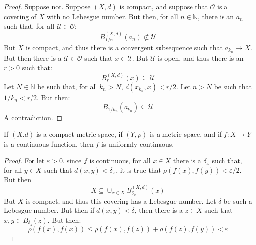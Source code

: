 \documentclass[crop=false,class=article,oneside]{standalone}
\begin{document}
            \begin{proof}
                Suppose not. Suppose $(X,d)$ is compact, and suppose
                that $\mathcal{O}$ is a covering of $X$ with no
                Lebesgue number. But then, for all $n\in\mathbb{N}$,
                there is an $a_{n}$ such that, for all
                $\mathcal{U}\in\mathcal{O}$:
                \begin{equation}
                    B_{1/n}^{(X,d)}(a_{n})\not\subset\mathcal{U}
                \end{equation}
                But $X$ is compact, and thus there is a convergent
                subsequence such that $a_{k_{n}}\rightarrow{X}$. 
                But then there is a $\mathcal{U}\in\mathcal{O}$ such
                that $x\in\mathcal{U}$. But $\mathcal{U}$ is open, and
                thus there is an $r>0$ such that:
                \begin{equation}
                    B_{r}^{(X,d)}(x)\subseteq\mathcal{U}
                \end{equation}
                Let $N\in\mathbb{N}$ be such that, for all
                $k_{n}>N$, $d(x_{k_{n}},x)<r/2$. Let
                $n>N$ be such that $1/k_{n}<r/2$. But then:
                \begin{equation}
                    B_{1/k_{n}}(a_{k_{n}})\subseteq\mathcal{U}
                \end{equation}
                A contradiction.
            \end{proof}
            \begin{theorem}
                If $(X.d)$ is a compact metric space, if $(Y,\rho)$
                is a metric space, and if $f:X\rightarrow{Y}$ is a
                continuous function, then $f$ is uniformly continuous.
            \end{theorem}
            \begin{proof}
                For let $\varepsilon>0$. since $f$ is continuous, for
                all $x\in{X}$ there is a $\delta_{x}$ such that,
                for all $y\in{X}$ such that $d(x,y)<\delta_{x}$, it
                is true that $\rho(f(x),f(y))<\varepsilon/2$. But then:
                \begin{equation}
                    X\subseteq\cup_{x\in{X}}B_{\delta_{x}}^{(X,d)}(x)
                \end{equation}
                But $X$ is compact, and thus this covering has a
                Lebesgue number. Let $\delta$ be such a Lebesgue number.
                But then if $d(x,y)<\delta$, then there is a
                $z\in{X}$ such that $x,y\in{B}_{\delta_{z}}(z)$.
                But then:
                \begin{equation}
                    \rho(f(x),f(x))\leq
                    \rho(f(x),f(z))+\rho(f(z),f(y))
                    <\varepsilon
                \end{equation}
            \end{proof}
\end{document}
